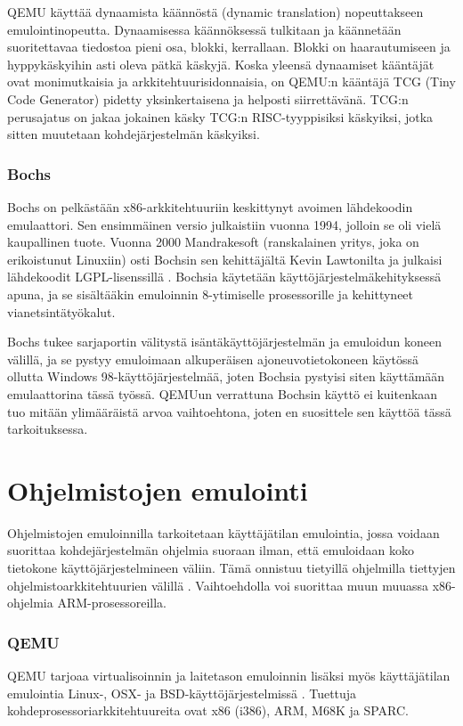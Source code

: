 QEMU käyttää dynaamista käännöstä (dynamic translation) nopeuttakseen emulointinopeutta. Dynaamisessa käännöksessä tulkitaan ja käännetään suoritettavaa tiedostoa pieni osa, blokki, kerrallaan. Blokki on haarautumiseen ja hyppykäskyihin asti oleva pätkä käskyjä. Koska yleensä dynaamiset kääntäjät ovat monimutkaisia ja arkkitehtuurisidonnaisia, on QEMU:n kääntäjä TCG (Tiny Code Generator) pidetty yksinkertaisena ja helposti siirrettävänä. TCG:n perusajatus on jakaa jokainen käsky TCG:n RISC-tyyppisiksi käskyiksi, jotka sitten muutetaan kohdejärjestelmän käskyiksi. \citep{qemu_tech}


\subsubsection{Bochs}
Bochs on pelkästään x86-arkkitehtuuriin keskittynyt avoimen lähdekoodin emulaattori. Sen ensimmäinen versio julkaistiin vuonna 1994, jolloin se oli vielä kaupallinen tuote. Vuonna 2000 Mandrakesoft (ranskalainen yritys, joka on erikoistunut Linuxiin) osti Bochsin sen kehittäjältä Kevin Lawtonilta ja julkaisi lähdekoodit LGPL-lisenssillä \cite{bochs0}. Bochsia käytetään käyttöjärjestelmäkehityksessä apuna, ja se sisältääkin emuloinnin 8-ytimiselle prosessorille ja kehittyneet vianetsintätyökalut. \citep{bochs_doc}

Bochs tukee sarjaportin välitystä isäntäkäyttöjärjestelmän ja emuloidun koneen välillä, ja se pystyy emuloimaan alkuperäisen ajoneuvotietokoneen käytössä ollutta Windows 98-käyttöjärjestelmää, joten Bochsia pystyisi siten käyttämään emulaattorina tässä työssä. QEMUun verrattuna Bochsin käyttö ei kuitenkaan tuo mitään ylimääräistä arvoa vaihtoehtona, joten en suosittele sen käyttöä tässä tarkoituksessa.


\section{Ohjelmistojen emulointi}
Ohjelmistojen emuloinnilla tarkoitetaan käyttäjätilan emulointia, jossa voidaan suorittaa kohdejärjestelmän ohjelmia suoraan ilman, että emuloidaan koko tietokone käyttöjärjestelmineen väliin. Tämä onnistuu tietyillä ohjelmilla tiettyjen ohjelmistoarkkitehtuurien välillä \cite{tinycc, qemu_use}. Vaihtoehdolla voi suorittaa muun muuassa x86-ohjelmia ARM-prosessoreilla.

\subsubsection{QEMU}
QEMU tarjoaa virtualisoinnin ja laitetason emuloinnin lisäksi myös käyttäjätilan emulointia Linux-, OSX- ja BSD-käyttöjärjestelmissä \cite{qemu_use}. Tuettuja kohdeprosessoriarkkitehtuureita ovat x86 (i386), ARM, M68K ja SPARC.

